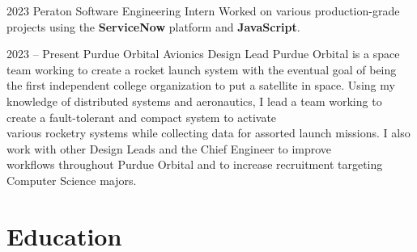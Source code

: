 \documentclass[
	10pt, %
]{FreemanCV}
\begin{document}
\begin{paracol}{2}

\jobentry
	{2023} %
	{} %
	{Peraton} %
	{Software Engineering Intern} %
	{Worked on various production-grade projects using the \textbf{ServiceNow} platform and \textbf{JavaScript}.} %


\jobentry
	{2023 -- Present} %
	{} %
	{Purdue Orbital} %
	{Avionics Design Lead} %
	{Purdue Orbital is a space team working to create a rocket launch system with the eventual goal of being the first independent college organization to put a satellite in space. Using my knowledge of distributed systems and aeronautics, I lead a team working to create a fault-tolerant and compact system to activate\\ various rocketry systems while collecting data for assorted launch missions. I also work with other Design Leads and the Chief Engineer to improve\\ workflows throughout Purdue Orbital and to increase recruitment targeting Computer Science majors.} %


\section{Education}





\begin{supertabular}{r l} %



\end{supertabular}
\end{paracol}
\end{document}
